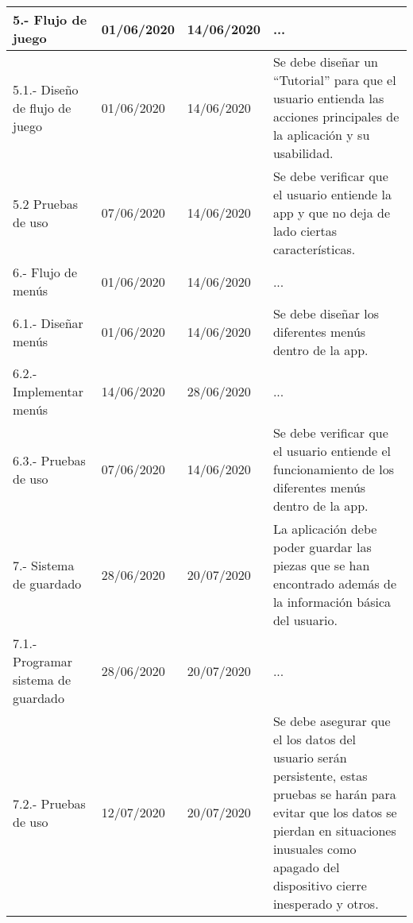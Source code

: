 \begin{longtable}{| p{}| p{}| p{}| p{}|}
\\
\hline 
	5.- Flujo de juego &
	01/06/2020 &
	14/06/2020 & 
	...
	\\
\hline 
	5.1.- Diseño de flujo de juego &
	01/06/2020 &
	14/06/2020 &
	Se debe diseñar un “Tutorial” para que el usuario entienda las acciones principales de la aplicación y su usabilidad.
\\
\hline 
	5.2 Pruebas de uso &
	07/06/2020 &
	14/06/2020 & 
	Se debe verificar que el usuario entiende la app y que no deja de lado ciertas características.
\\
\hline 
	6.- Flujo de menús &
	01/06/2020 &
	14/06/2020 &
	...
\\ 
\hline 
	6.1.- Diseñar menús &
	01/06/2020 &
	14/06/2020 &
	Se debe diseñar los diferentes menús dentro de la app.
\\
\hline 
	6.2.- Implementar menús &
	14/06/2020 &
	28/06/2020 &
	...
\\ 
\hline 
	6.3.- Pruebas de uso &
	07/06/2020 &
	14/06/2020 & 
	Se debe verificar que el usuario entiende el funcionamiento de los diferentes menús dentro de la app.
\\
\hline 
	7.- Sistema de guardado &
	28/06/2020 &
	20/07/2020 & 
	La aplicación debe poder guardar las piezas que se han encontrado además de la información básica del usuario.
\\ 
\hline 
	7.1.- Programar sistema de guardado &
	28/06/2020 &
	20/07/2020 & 
	...
\\ 
\hline 
	7.2.- Pruebas de uso &
	12/07/2020 &
	20/07/2020 &
	Se debe asegurar que el los datos del usuario serán persistente, estas pruebas se harán para evitar que los datos se pierdan en situaciones inusuales como apagado del dispositivo cierre inesperado y otros.
\\
\hline
\end{longtable} 

